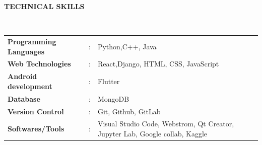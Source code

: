 \documentclass[a4paper,10pt]{article}
\begin{document}
\colorbox{titleColor}{\parbox{6.7in}{\textbf{TECHNICAL SKILLS}}}\\

\begin{tabular}{p{1.6in}p{0.1in}p{4.5in}}
  \textbf{\small{Programming Languages}} & : & {{Python,C++, Java}}                                                              \\
  \textbf{\small{Web Technologies}}      & : & {{React,Django, HTML, CSS, JavaScript }}                                          \\
  \textbf{\small{Android development}}   & : & {{Flutter}}                                                                       \\
  \textbf{\small{Database}}              & : & {{MongoDB}}                                                                       \\
  \textbf{\small{Version Control}}       & : & {{Git, Github, GitLab}}                                                           \\
  \textbf{\small{Softwares/Tools}}       & : & {{ Visual Studio Code, Webstrom, Qt Creator, Jupyter Lab, Google collab, Kaggle}} \\
\end{tabular}




\end{document}
